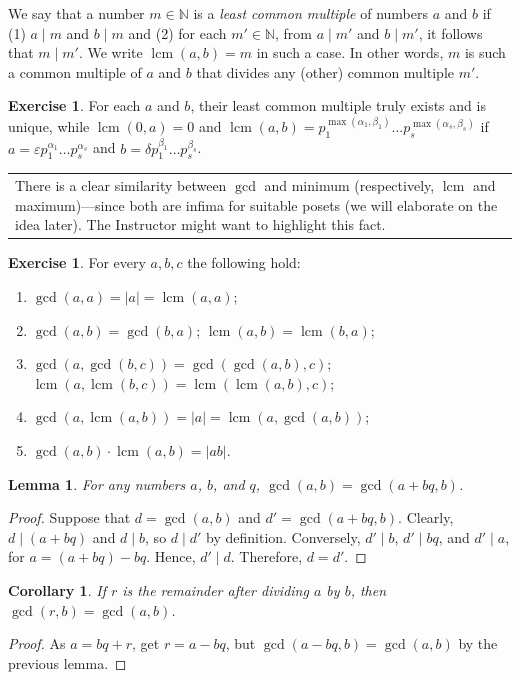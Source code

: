 \documentclass[12pt,notitlepage]{article}
\theoremstyle{plain}
\newtheorem{lemma}[thm]{Lemma}
\newtheorem{corr}[thm]{Corollary}
\theoremstyle{definition}
\newtheorem{exc}[thm]{Exercise}
\theoremstyle{plain}
\newcommand{\N}{\mathbb{N}}
\newcommand{\eps}{\varepsilon}
\newcommand{\1}{\mathbf{1}}
\newcommand{\0}{\mathbf{0}}
\newcommand{\dvd}{\mathop{\mid}}
\DeclareMathOperator{\lcm}{lcm}
\newcommand{\mcomm}[1]{
\medskip\noindent\begin{tabular}{| l}
\parbox{0.99\textwidth}{{\small
#1 }}\end{tabular}
\smallskip}
\begin{document}
We say that a number $m \in \N$ is a \emph{least common multiple} of numbers $a$ and $b$ if (1) $a \dvd m$ and $b \dvd m$ and (2) for each $m' \in \N$, from $a \dvd m'$ and $b \dvd m'$, it follows that $m \dvd m'$. We write $\lcm (a, b) = m$ in such a case. In other words, $m$ is such a common multiple of $a$ and $b$ that divides any (other) common multiple $m'$.
\begin{exc}
For each $a$ and $b$, their least common multiple truly exists and is unique, while $\lcm(0, a) = 0$ and $\lcm(a, b) = p^{\max(\alpha_1, \beta_1)}_1\ldots p^{\max(\alpha_s, \beta_s)}_s$ if $a = \eps p^{\alpha_1}_1\ldots p^{\alpha_s}_s$ and $b = \delta p^{\beta_1}_1\ldots p^{\beta_s}_s$.
\end{exc}
\mcomm{There is a clear similarity between $\gcd$ and minimum (respectively, $\lcm$ and maximum)---since both are infima for suitable posets (we will elaborate on the idea later). The Instructor might want to highlight this fact.}
\begin{exc} For every $a, b, c$ the following hold:
\begin{enumerate}
\item $\gcd(a, a) = |a| = \lcm(a, a)$;
\item $\gcd(a, b) = \gcd(b,a)$; $\lcm(a, b) = \lcm(b,a)$;
\item $\gcd(a, \gcd(b, c)) = \gcd(\gcd(a, b), c)$; $\lcm(a, \lcm(b, c)) = \lcm(\lcm(a, b), c)$;
\item $\gcd(a, \lcm(a, b)) = |a| = \lcm(a, \gcd(a, b))$;
\item $\gcd(a,b)\cdot \lcm(a, b) = |ab|$.
\end{enumerate}
\end{exc}

\begin{lemma}
For any numbers $a$, $b$, and $q$, $\gcd(a, b) = \gcd(a + bq, b)$.
\end{lemma}
\begin{proof}
Suppose that $d = \gcd(a,b)$ and $d' = \gcd(a + bq, b)$. Clearly, $d \dvd (a + bq)$ and $d \dvd b$, so $d \dvd d'$ by definition. Conversely, $d' \dvd b$, $d' \dvd bq$, and $d' \dvd a$, for $a = (a + bq) - bq$. Hence, $d' \dvd d$. Therefore, $d = d'$.
\end{proof}

\begin{corr}\label{L5:c_gcd_rem}
If $r$ is the remainder after dividing $a$ by $b$, then $\gcd(r, b) = \gcd(a, b)$.
\end{corr}
\begin{proof}
As $a = bq + r$, get $r = a - bq$, but $\gcd(a - bq, b) = \gcd(a, b)$ by the previous lemma.
\end{proof}
\end{document}
